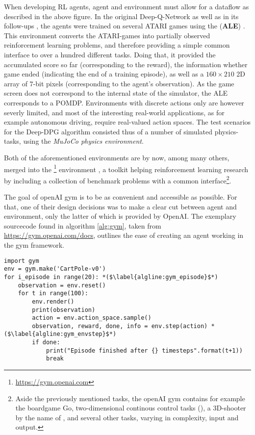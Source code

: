 When developing RL agents, agent and environment must allow for a dataflow as described in the above figure. In the original Deep-Q-Network \cite{mnih_playing_2013} as well as in its follow-ups \cite{van_hasselt_deep_2015, wang_dueling_2015}, the agents were trained on several ATARI games using the  (\textbf{ALE}) \cite{bellemare_arcade_2012}. This environment converts the ATARI-games into partially observed reinforcement learning problems, and therefore providing a simple common interface to over a hundred different tasks. Doing that, it provided the accumulated score so far (corresponding to the reward), the information whether game ended (indicating the end of a training episode), as well as a $160 \times 210$  2D array of 7-bit pixels (corresponding to the agent's observation). As the game screen does not correspond to the internal state of the simulator, the ALE corresponds to a POMDP. Environments with discrete actions only are however severly limited, and most of the interesting real-world applications, as for example autonomous driving, require real-valued action spaces. The test scenarios for the Deep-DPG algorithm consisted thus of a number of simulated physics-tasks, using the \textit{MuJoCo physics environment}. 

Both of the aforementioned environments are by now, among many others, merged into the \footnote{\url{https://gym.openai.com}} environment \cite{brockman_openai_2016}, a toolkit helping reinforcement learning research by including a collection of benchmark problems with a common interface\footnote{Aside the previously mentioned tasks, the openAI gym contains for example the boardgame Go, two-dimensional continous control tasks (), a 3D-shooter by the name of , and several other tasks, varying in complexity, input and output.}.

The goal of openAI gym is to be as convenient and accessible as possible. For that, one of their design decisions was to make a clear cut between agent and environment, only the latter of which is provided by OpenAI. The exemplary sourcecode found in algorithm \ref{alg:gym}, taken from \url{https://gym.openai.com/docs}, outlines the ease of creating an agent working in the gym framework.
\begin{algorithm}[h]
\begin{lstlisting}[style=Python]
import gym
env = gym.make('CartPole-v0')
for i_episode in range(20): *($\label{algline:gym_episode}$*)
	observation = env.reset()
	for t in range(100):
		env.render()
		print(observation)
		action = env.action_space.sample()
		observation, reward, done, info = env.step(action) *($\label{algline:gym_envstep}$*)
		if done:
			print("Episode finished after {} timesteps".format(t+1))
			break
\end{lstlisting}%
\caption{Interaction with the openAI gym environment}
\label{alg:gym}
\end{algorithm}


